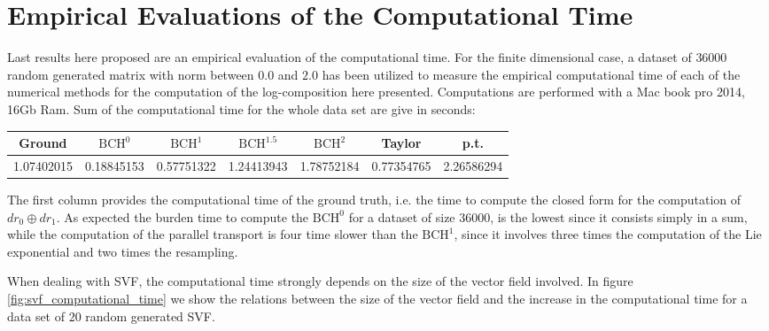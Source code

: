 \section{Empirical Evaluations of the Computational Time}

Last results here proposed are an empirical evaluation of the computational time. 
For the finite dimensional case, a dataset of $36000$ random generated matrix with norm between $0.0$ and $2.0$ has been utilized to measure the empirical computational time of each of the numerical methods for the computation of the log-composition here presented. Computations are performed with a Mac book pro 2014, 16Gb Ram. Sum of the computational time for the whole data set are give in seconds:\\

\hspace{-1cm}
\begin{tabular}{ c | c | c | c | c | c | c }
Ground & $\text{BCH}^0$ & $\text{BCH}^1$ & $\text{BCH}^{1.5}$ & $\text{BCH}^2$ & Taylor & p.t. \\
\hline
1.07402015 & 0.18845153 & 0.57751322 & 1.24413943 & 1.78752184 & 0.77354765 &
2.26586294 
\end{tabular}
\vspace{0.5cm}

The first column provides the computational time of the ground truth, i.e. the time to compute the closed form for the computation of $dr_0 \oplus dr_{1}$. As expected the burden time to compute the $\text{BCH}^0$ for a dataset of size $36000$, is the lowest since it consists simply in a sum, while the computation of the parallel transport is four time slower than the $\text{BCH}^1$, since it involves three times the computation of the Lie exponential and two times the resampling.

When dealing with SVF, the computational time strongly depends on the size of the vector field involved. In figure \ref{fig:svf_computational_time} we show the relations between the size of the vector field and the increase in the computational time for a data set of $20$ random generated SVF.

